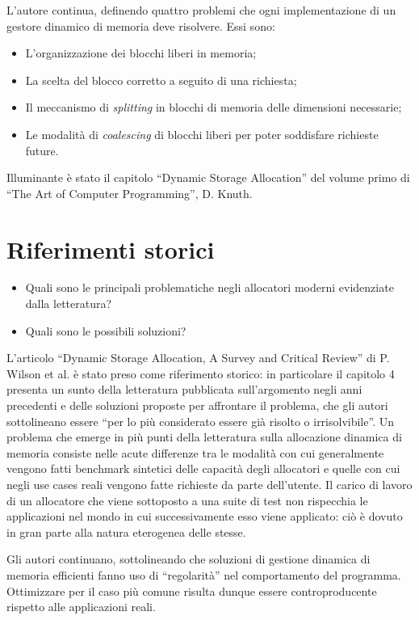 \documentclass[noexaminfo]{sapthesis}
\begin{document}
L’autore continua, definendo quattro problemi che ogni implementazione di un gestore dinamico di memoria deve risolvere. Essi sono:
\begin{itemize}
  \item L’organizzazione dei blocchi liberi in memoria;
  \item La scelta del blocco corretto a seguito di una richiesta;
  \item Il meccanismo di \textit{splitting} in blocchi di memoria delle dimensioni necessarie;
  \item Le modalità di \textit{coalescing} di blocchi liberi per poter soddisfare richieste future.
\end{itemize}

Illuminante è stato il capitolo ``Dynamic Storage Allocation'' del volume primo di ``The Art of Computer Programming'', D. Knuth.

\section{Riferimenti storici}
\begin{itemize}
  \item Quali sono le principali problematiche negli allocatori moderni evidenziate dalla letteratura?
  \item Quali sono le possibili soluzioni?
\end{itemize}

L’articolo ``Dynamic Storage Allocation, A Survey and Critical Review'' di P. Wilson et al. è stato preso come riferimento storico: in particolare il capitolo 4 presenta un sunto della letteratura pubblicata sull’argomento negli anni precedenti e delle soluzioni proposte per affrontare il problema, che gli autori sottolineano essere ``per lo più considerato essere già risolto o irrisolvibile''. Un problema che emerge in più punti della letteratura sulla allocazione dinamica di memoria consiste nelle acute differenze tra le modalità con cui generalmente vengono fatti benchmark sintetici delle capacità degli allocatori e quelle con cui negli use cases reali vengono fatte richieste da parte dell’utente. Il carico di lavoro di un allocatore che viene sottoposto a una suite di test non rispecchia le applicazioni nel mondo in cui successivamente esso viene applicato: ciò è dovuto in gran parte alla natura eterogenea delle stesse.

Gli autori continuano, sottolineando che soluzioni di gestione dinamica di memoria efficienti fanno uso di ``regolarità'' nel comportamento del programma. Ottimizzare per il caso più comune risulta dunque essere controproducente rispetto alle applicazioni reali.
\end{document}
